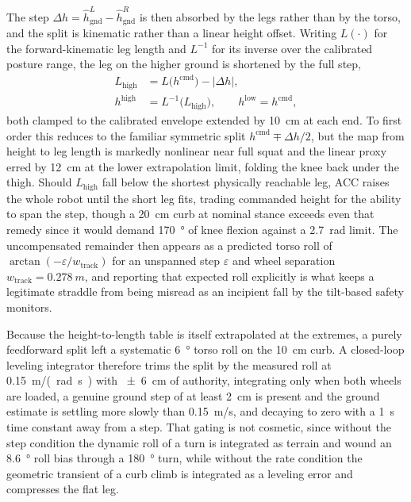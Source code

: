 \documentclass[a4paper,fleqn]{cas-dc}
\begin{document}
The step $\Delta h = \hat{h}_{\text{gnd}}^{L} - \hat{h}_{\text{gnd}}^{R}$ is
then absorbed by the legs rather than by the torso, and the split is kinematic
rather than a linear height offset. Writing $L(\cdot)$ for the
forward-kinematic leg length and $L^{-1}$ for its inverse over the calibrated
posture range, the leg on the higher ground is shortened by the full step,
\begin{align}
L_{\text{high}} &= L\big(h^{\text{cmd}}\big) - |\Delta h|,\\
h^{\text{high}} &= L^{-1}\!\big(L_{\text{high}}\big), \qquad
h^{\text{low}} = h^{\text{cmd}},
\label{eq:terrain_split}
\end{align}
both clamped to the calibrated envelope extended by \SI{10}{cm} at each end. To
first order this reduces to the familiar symmetric split
$h^{\text{cmd}} \mp \Delta h/2$, but the map from height to leg length is
markedly nonlinear near full squat and the linear proxy erred by \SI{12}{cm} at
the lower extrapolation limit, folding the knee back under the thigh. Should
$L_{\text{high}}$ fall below the shortest physically reachable leg, ACC raises
the whole robot until the short leg fits, trading commanded height for the
ability to span the step, though a \SI{20}{cm} curb at nominal stance exceeds
even that remedy since it would demand \SI{170}{\degree} of knee flexion against
a \SI{2.7}{rad} limit. The uncompensated remainder then appears as a predicted
torso roll of $\arctan(-\varepsilon / w_{\text{track}})$ for an unspanned step
$\varepsilon$ and wheel separation $w_{\text{track}}{=}\SI{0.278}{m}$, and
reporting that expected roll explicitly is what keeps a legitimate straddle from
being misread as an incipient fall by the tilt-based safety monitors.

Because the height-to-length table is itself extrapolated at the extremes, a
purely feedforward split left a systematic \SI{+6}{\degree} torso roll on the
\SI{10}{cm} curb. A closed-loop leveling integrator therefore trims the split by
the measured roll at \SI{0.15}{m/(rad.s)} with \SI{\pm 6}{cm} of authority,
integrating only when both wheels are loaded, a genuine ground step of at least
\SI{2}{cm} is present and the ground estimate is settling more slowly than
\SI{0.15}{m/s}, and decaying to zero with a \SI{1}{s} time constant away from a
step. That gating is not cosmetic, since without the step condition the dynamic
roll of a turn is integrated as terrain and wound an \SI{8.6}{\degree} roll bias
through a \SI{180}{\degree} turn, while without the rate condition the geometric
transient of a curb climb is integrated as a leveling error and compresses the
flat leg.
\end{document}
